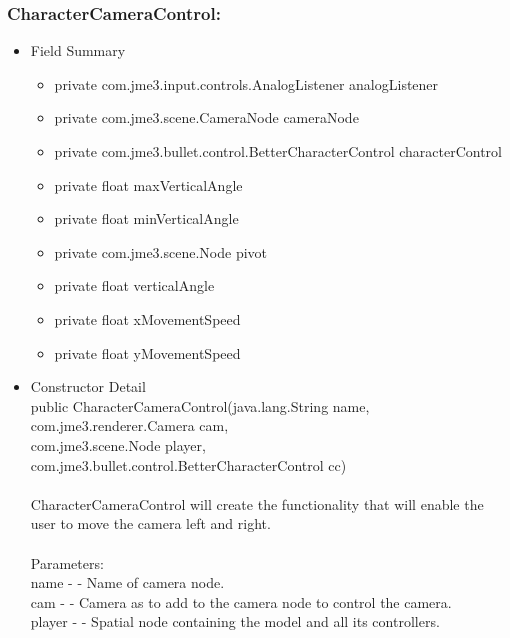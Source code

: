 \documentclass[letterpaper]{article}
\begin{document}
								\subsubsection*{CharacterCameraControl:}
								\vspace{0.1in}
									\begin{itemize}
										\item	Field Summary
												\begin{itemize}
													\item	private com.jme3.input.controls.AnalogListener	analogListener 
													\item	private com.jme3.scene.CameraNode	cameraNode 
													\item	private com.jme3.bullet.control.BetterCharacterControl	characterControl 
													\item	private float	maxVerticalAngle 
													\item	private float	minVerticalAngle 
													\item	private com.jme3.scene.Node	pivot 
													\item	private float	verticalAngle 
													\item	private float	xMovementSpeed 
													\item	private float	yMovementSpeed
												\end{itemize}
										\item	Constructor Detail \\
												public CharacterCameraControl(java.lang.String name, \\
				                     com.jme3.renderer.Camera cam, \\
				                     com.jme3.scene.Node player, \\
				                     com.jme3.bullet.control.BetterCharacterControl cc) \\ \\
												CharacterCameraControl will create the functionality that will enable the user to move the camera left and right. \\ \\
												Parameters: \\
												name - - Name of camera node. \\
												cam - - Camera as to add to the camera node to control the camera. \\
												player - - Spatial node containing the model and all its controllers.

\end{itemize}
\end{document}

